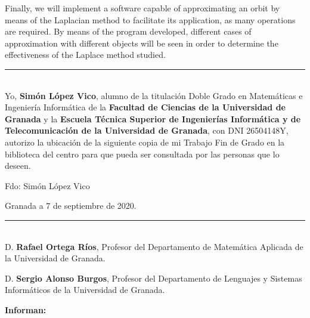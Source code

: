 Finally, we will implement a software capable of approximating an orbit by means of the Laplacian method to facilitate its application, as many operations are required. By means of the program developed, different cases of approximation with different objects will be seen in order to determine the effectiveness of the Laplace method studied.

\newpage






\thispagestyle{empty}

\noindent\rule[-1ex]{\textwidth}{2pt}\\[4.5ex]

Yo, \textbf{Simón López Vico}, alumno de la titulación Doble Grado en Matemáticas e Ingeniería Informática de la \textbf{Facultad de Ciencias de la Universidad de Granada} y la \textbf{Escuela Técnica Superior de Ingenierías Informática y de Telecomunicación de la Universidad de Granada}, con DNI 26504148Y, autorizo la ubicación de la siguiente copia de mi Trabajo Fin de Grado en la biblioteca del centro para que pueda ser consultada por las personas que lo deseen.

\vspace{6cm}

\noindent Fdo: Simón López Vico

\vspace{2cm}

\begin{flushright}
Granada a 7 de septiembre de 2020.
\end{flushright}

\clearpage{\thispagestyle{empty}\cleardoublepage}

\thispagestyle{empty}

\noindent\rule[-1ex]{\textwidth}{2pt}\\[4.5ex]

D. \textbf{Rafael Ortega Ríos}, Profesor del Departamento de Matemática Aplicada de la Universidad de Granada.

\vspace{0.5cm}

D. \textbf{Sergio Alonso Burgos}, Profesor del Departamento de Lenguajes y Sistemas Informáticos de la Universidad de Granada.


\vspace{0.5cm}

\textbf{Informan:}

\vspace{0.5cm}

